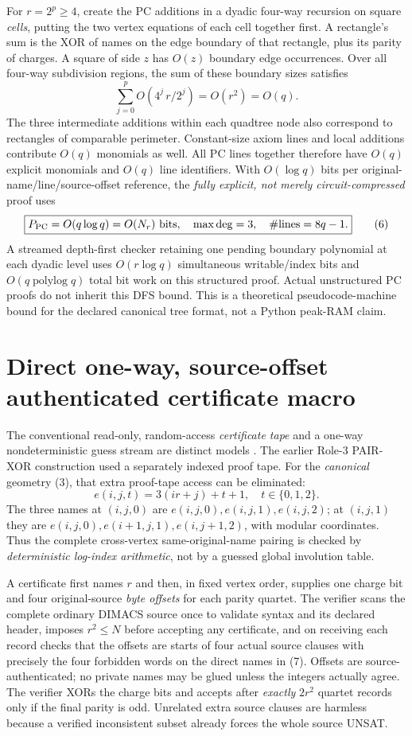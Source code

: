 \documentclass[11pt]{article}
\begin{document}
For $r=2^p\ge4$, create the PC additions in a dyadic four-way recursion on square \emph{cells}, putting the two vertex equations of each cell together first.  A rectangle's sum is the XOR of names on the edge boundary of that rectangle, plus its parity of charges.  A square of side $z$ has $O(z)$ boundary edge occurrences.  Over all four-way subdivision regions, the sum of these boundary sizes satisfies
\[
\sum_{j=0}^{p}O(4^j\,r/2^j)=O(r^2)=O(q).
\tag{5}
\]
The three intermediate additions within each quadtree node also correspond to rectangles of comparable perimeter.  Constant-size axiom lines and local additions contribute $O(q)$ monomials as well.  All PC lines together therefore have $O(q)$ explicit monomials and $O(q)$ line identifiers.  With $O(\log q)$ bits per original-name/line/source-offset reference, the \emph{fully explicit, not merely circuit-compressed} proof uses
\[
\boxed{P_{\rm PC}=O(q\log q)=O(N_r)\text{ bits},\quad
\max\deg=3,\quad\#\mathrm{lines}=8q-1.}\tag{6}
\]
A streamed depth-first checker retaining one pending boundary polynomial at each dyadic level uses $O(r\log q)$ simultaneous writable/index bits and $O(q\operatorname{polylog}q)$ total bit work on this structured proof.  Actual unstructured PC proofs do not inherit this DFS bound.  This is a theoretical pseudocode-machine bound for the declared canonical tree format, not a Python peak-RAM claim.

\section{Direct one-way, source-offset authenticated certificate macro}
The conventional read-only, random-access \emph{certificate tape} and a one-way nondeterministic guess stream are distinct models \cite{vanmelkebeek}.  The earlier Role-3 PAIR-XOR construction used a separately indexed proof tape.  For the \emph{canonical} geometry (3), that extra proof-tape access can be eliminated:
\[
e(i,j,t)=3(ir+j)+t+1,\quad t\in\{0,1,2\}.
\tag{7}
\]
The three names at $(i,j,0)$ are $e(i,j,0),e(i,j,1),e(i,j,2)$; at $(i,j,1)$ they are $e(i,j,0),e(i+1,j,1),e(i,j+1,2)$, with modular coordinates.  Thus the complete cross-vertex same-original-name pairing is checked by \emph{deterministic log-index arithmetic}, not by a guessed global involution table.

A certificate first names $r$ and then, in fixed vertex order, supplies one charge bit and four original-source \emph{byte offsets} for each parity quartet.  The verifier scans the complete ordinary DIMACS source once to validate syntax and its declared header, imposes $r^2\le N$ before accepting any certificate, and on receiving each record checks that the offsets are starts of four actual source clauses with precisely the four forbidden words on the direct names in (7).  Offsets are source-authenticated; no private names may be glued unless the integers actually agree.  The verifier XORs the charge bits and accepts after \emph{exactly} $2r^2$ quartet records only if the final parity is odd.  Unrelated extra source clauses are harmless because a verified inconsistent subset already forces the whole source UNSAT.
\end{document}
